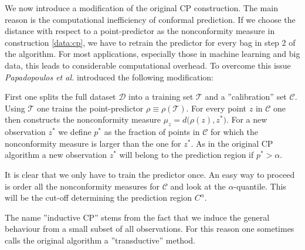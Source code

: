     We now introduce a modification of the original CP construction. The main reason is the computational inefficiency of conformal prediction. If we choose the distance with respect to a point-predictor as the nonconformity measure in construction \ref{data:cp}, we have to retrain the predictor for every bag in step 2 of the algorithm. For most applications, especially those in machine learning and big data, this leads to considerable computational overhead. To overcome this issue \textit{Papadopoulos et al.} introduced the following modification:
    \begin{construct}[Inductive CP]
        First one splits the full dataset $\mathcal{D}$ into a training set $\mathcal{T}$ and a ''calibration'' set $\mathcal{C}$. Using $\mathcal{T}$ one trains the point-predictor $\rho\equiv\rho(\mathcal{T})$. For every point $z$ in $\mathcal{C}$ one then constructs the nonconformity measure $\mu_z = d\big(\rho(z), z^*\big)$. For a new observation $z^*$ we define $p^*$ as the fraction of points in $\mathcal{C}$ for which the nonconformity measure is larger than the one for $z^*$. As in the original CP algorithm a new observation $z^*$ will belong to the prediction region if $p^*>\alpha$.
    \end{construct}
    It is clear that we only have to train the predictor once. An easy way to proceed is order all the nonconformity measures for $\mathcal{C}$ and look at the $\alpha$-quantile. This will be the cut-off determining the prediction region $C^\alpha$.

    \begin{remark}
        The name ''inductive CP'' stems from the fact that we induce the general behaviour from a small subset of all observations. For this reason one sometimes calls the original algorithm a ''transductive'' method.
    \end{remark}

